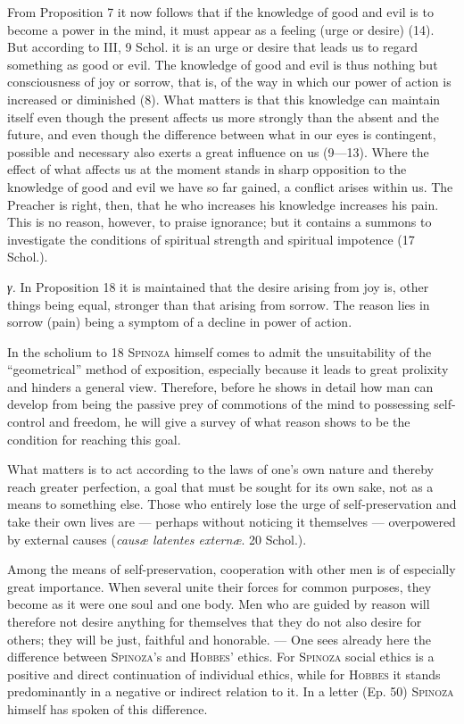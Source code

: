 \documentclass[12pt]{article}
\newcommand{\opage}[1]{\marginnote{\footnotesize\textit{[#1]}}}
\begin{document}
From Proposition 7 it now follows that if the knowledge of good and evil is to become a power in
\opage{75}the mind, it must appear as a feeling (urge or desire) (14). But according to III, 9
Schol. it is an urge or desire that leads us to regard something as good or evil. The knowledge of
good and evil is thus nothing but consciousness of joy or sorrow, that is, of the way in which our
power of action is increased or diminished (8). What matters is that this knowledge can maintain
itself even though the present affects us more strongly than the absent and the future, and even
though the difference between what in our eyes is contingent, possible and necessary also exerts a
great influence on us (9---13). Where the effect of what affects us at the moment stands in sharp
opposition to the knowledge of good and evil we have so far gained, a conflict arises within us.
The Preacher is right, then, that he who increases his knowledge increases his pain. This is no
reason, however, to praise ignorance; but it contains a summons to investigate the conditions of
spiritual strength and spiritual impotence (17 Schol.).

\textit{γ.} In Proposition 18 it is maintained that the desire arising from joy is, other things
being equal, stronger than that arising from sorrow. The reason lies in sorrow (pain) being a
symptom of a decline in power of action.

In the scholium to 18 \textsc{Spinoza} himself comes to admit the unsuitability of the
``geometrical'' method of exposition, especially because it leads to great prolixity and hinders a
general view. Therefore, before he shows in detail how man can develop from being the passive prey
of commotions of the mind to possessing self-control and freedom, he will give a survey of what
reason shows to be the condition for reaching this goal.

What matters is to act according to the laws of one's own nature and thereby reach greater
perfection, a goal that must be sought for its own sake, not as a means to something else. Those
who entirely lose the urge of self-preservation and take their own lives are --- perhaps without
noticing it themselves --- overpowered by external causes (\textit{causæ latentes externæ}. 20
Schol.).

Among the means of self-preservation, cooperation with other men is of especially great
importance. When several unite their forces for common purposes, they become as it were one soul
and one body. Men who are guided by reason will therefore not desire anything for themselves that
they do not also desire for others; they will be just, faithful and honorable. --- One sees
already here the difference between \textsc{Spinoza}'s and \textsc{Hobbes}' ethics. For
\textsc{Spinoza} social ethics is a positive and direct continuation of individual ethics, while
for \textsc{Hobbes} it stands predominantly in a negative or indirect relation to it. In a letter
(Ep. 50) \textsc{Spinoza} himself has spoken of this difference.
\end{document}
